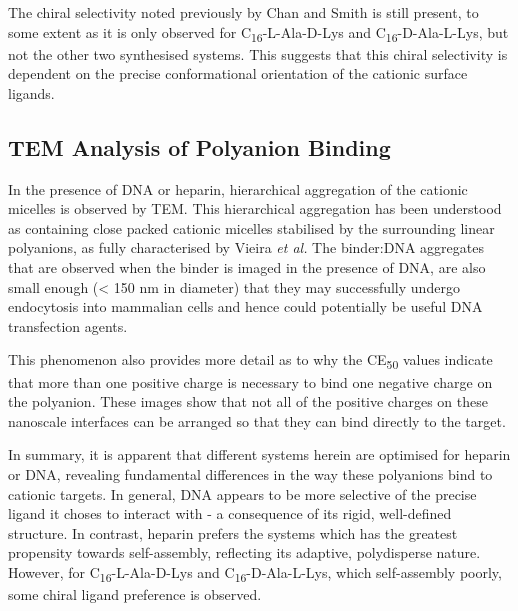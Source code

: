 The chiral selectivity noted previously by Chan and Smith is still present, to some extent as it is only observed for C\textsubscript{16}-L-Ala-D-Lys and C\textsubscript{16}-D-Ala-L-Lys, but not the other two synthesised systems. This suggests that this chiral selectivity is dependent on the precise conformational orientation of the cationic surface ligands. 

\subsection{TEM Analysis of Polyanion Binding}
In the presence of DNA or heparin, hierarchical aggregation of the cationic micelles is observed by TEM. This hierarchical aggregation has been understood as containing close packed cationic micelles stabilised by the surrounding linear polyanions, as fully characterised by Vieira \textit{et al.}\textsuperscript{\cite{Vieira2017EmergenceHeparin}} The binder:DNA aggregates that are observed when the binder is imaged in the presence of DNA, are also small enough (< 150 nm in diameter) that they may successfully undergo endocytosis into mammalian cells and hence could potentially be useful DNA transfection agents.\textsuperscript{\cite{Ghosh2008EfficientNanoparticles}} 

This phenomenon also provides more detail as to why the CE\textsubscript{50} values indicate that more than one positive charge is necessary to bind one negative charge on the polyanion. These images show that not all of the positive charges on these nanoscale interfaces can be arranged so that they can bind directly to the target. 

In summary, it is apparent that different systems herein are optimised for heparin or DNA, revealing fundamental differences in the way these polyanions bind to cationic targets. In general, DNA appears to be more selective of the precise ligand it choses to interact with - a consequence of its rigid, well-defined structure. In contrast, heparin prefers the systems which has the greatest propensity towards self-assembly, reflecting its adaptive, polydisperse nature. However, for C\textsubscript{16}-L-Ala-D-Lys and C\textsubscript{16}-D-Ala-L-Lys, which self-assembly poorly, some chiral ligand preference is observed. 
